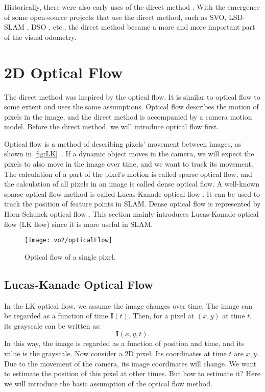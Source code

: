 Historically, there were also early uses of the direct method {\cite{Silveira2008}}. With the emergence of some open-source projects that use the direct method, such as SVO{\cite{Forster2014}}, LSD-SLAM {\cite{Engel2014}}, DSO {\cite{Engel2016}}, etc., the direct method became a more and more important part of the visual odometry.

\section{2D Optical Flow}
The direct method was inspired by the optical flow. It is similar to optical flow to some extent and uses the same assumptions. Optical flow describes the motion of pixels in the image, and the direct method is accompanied by a camera motion model. Before the direct method, we will introduce optical flow first.

Optical flow is a method of describing pixels' movement between images, as shown in \autoref{fig:LK}~. If a dynamic object moves in the camera, we will expect the pixels to also move in the image over time, and we want to track its movement. The calculation of a part of the pixel's motion is called sparse optical flow, and the calculation of all pixels in an image is called dense optical flow. A well-known sparse optical flow method is called Lucas-Kanade optical flow \cite{Lucas1981}. It can be used to track the position of feature points in SLAM. Dense optical flow is represented by Horn-Schunck optical flow \cite{Horn1981}. This section mainly introduces Lucas-Kanade optical flow (LK flow) since it is more useful in SLAM. 

\begin{figure}[!htp]
	\centering
	\texttt{[image: vo2/opticalFlow]}
	\caption{Optical flow of a single pixel.}
	\label{fig:LK}
\end{figure}

\subsection*{Lucas-Kanade Optical Flow}
In the LK optical flow, we assume the image changes over time. The image can be regarded as a function of time $\mathbf{I}(t)$. Then, for a pixel at $(x,y)$ at time $t$, its grayscale can be written as:
\[
\mathbf{I}(x,y,t).
\]
In this way, the image is regarded as a function of position and time, and its value is the grayscale. Now consider a 2D pixel. Its coordinates at time $t$ are $x,y$. Due to the movement of the camera, its image coordinates will change. We want to estimate the position of this pixel at other times. But how to estimate it? Here we will introduce the basic assumption of the optical flow method.

